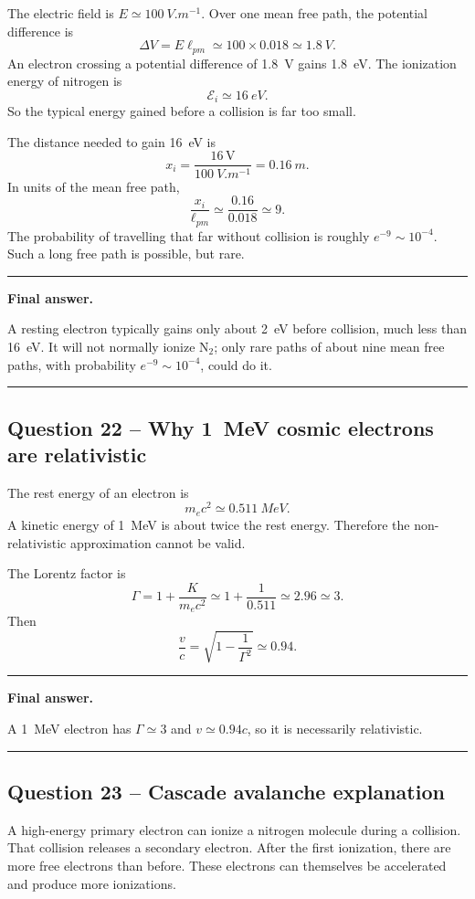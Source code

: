 \documentclass[11pt,a4paper]{article}
\newenvironment{finalanswer}{%
  \begin{center}\begin{minipage}{0.94\linewidth}\hrule\vspace{0.45em}\textbf{Final answer. }%
}{%
  \vspace{0.45em}\hrule\end{minipage}\end{center}%
}
\newcommand{\Ntwo}{\ensuremath{\mathrm{N}_2}}
\begin{document}
The electric field is $E\simeq\SI{100}{V.m^{-1}}$. Over one mean free path, the potential difference is
\[
 \Delta V=E\ell_{pm}\simeq 100\times0.018\simeq\SI{1.8}{V}.
\]
An electron crossing a potential difference of \SI{1.8}{V} gains \SI{1.8}{eV}. The ionization energy of nitrogen is
\[
 \mathcal{E}_i\simeq\SI{16}{eV}.
\]
So the typical energy gained before a collision is far too small.

The distance needed to gain \SI{16}{eV} is
\[
 x_i=\frac{16\,\mathrm{V}}{\SI{100}{V.m^{-1}}}=\SI{0.16}{m}.
\]
In units of the mean free path,
\[
 \frac{x_i}{\ell_{pm}}\simeq\frac{0.16}{0.018}\simeq 9.
\]
The probability of travelling that far without collision is roughly $e^{-9}\sim10^{-4}$. Such a long free path is possible, but rare.

\begin{finalanswer}
A resting electron typically gains only about \SI{2}{eV} before collision, much less than \SI{16}{eV}. It will not normally ionize \Ntwo; only rare paths of about nine mean free paths, with probability $e^{-9}\sim10^{-4}$, could do it.
\end{finalanswer}

\subsection*{Question 22 -- Why \SI{1}{MeV} cosmic electrons are relativistic}

The rest energy of an electron is
\[
 m_e c^2\simeq\SI{0.511}{MeV}.
\]
A kinetic energy of \SI{1}{MeV} is about twice the rest energy. Therefore the non-relativistic approximation cannot be valid.

The Lorentz factor is
\[
 \Gamma=1+\frac{K}{m_e c^2}
 \simeq1+\frac{1}{0.511}
 \simeq2.96\simeq3.
\]
Then
\[
 \frac{v}{c}=\sqrt{1-\frac{1}{\Gamma^2}}
 \simeq0.94.
\]

\begin{finalanswer}
A \SI{1}{MeV} electron has $\Gamma\simeq3$ and $v\simeq0.94c$, so it is necessarily relativistic.
\end{finalanswer}

\subsection*{Question 23 -- Cascade avalanche explanation}

A high-energy primary electron can ionize a nitrogen molecule during a collision. That collision releases a secondary electron. After the first ionization, there are more free electrons than before. These electrons can themselves be accelerated and produce more ionizations.
\end{document}
